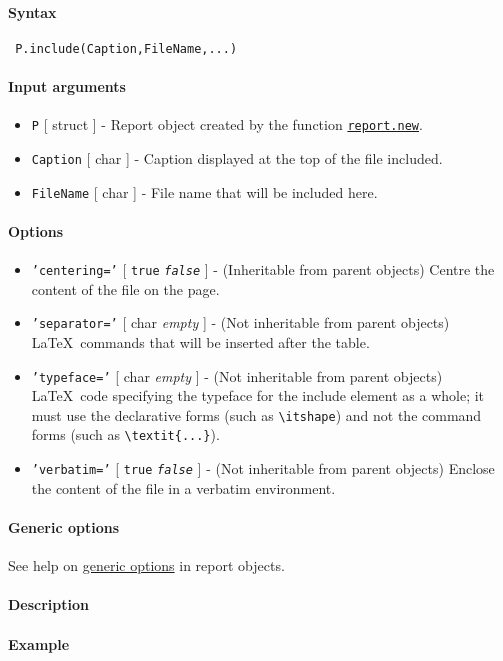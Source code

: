 


	\paragraph{Syntax}
 
 \begin{verbatim}
 P.include(Caption,FileName,...)
 \end{verbatim}
 
 \paragraph{Input arguments}
 
 \begin{itemize}
 \item
   \texttt{P} {[} struct {]} - Report object created by the function
   \href{report/new}{\texttt{report.new}}.
 \item
   \texttt{Caption} {[} char {]} - Caption displayed at the top of the
   file included.
 \item
   \texttt{FileName} {[} char {]} - File name that will be included here.
 \end{itemize}
 
 \paragraph{Options}
 
 \begin{itemize}
 \item
   \texttt{'centering='} {[} \texttt{true} \textbar{}
   \emph{\texttt{false}} {]} - (Inheritable from parent objects) Centre
   the content of the file on the page.
 \item
   \texttt{'separator='} {[} char \textbar{} \emph{empty} {]} - (Not
   inheritable from parent objects) \LaTeX~commands that will be inserted
   after the table.
 \item
   \texttt{'typeface='} {[} char \textbar{} \emph{empty} {]} - (Not
   inheritable from parent objects) \LaTeX~code specifying the typeface
   for the include element as a whole; it must use the declarative forms
   (such as \texttt{\textbackslash{}itshape}) and not the command forms
   (such as \texttt{\textbackslash{}textit\{...\}}).
 \item
   \texttt{'verbatim='} {[} \texttt{true} \textbar{}
   \emph{\texttt{false}} {]} - (Not inheritable from parent objects)
   Enclose the content of the file in a verbatim environment.
 \end{itemize}
 
 \paragraph{Generic options}
 
 See help on \href{report/Contents}{generic options} in report objects.
 
 \paragraph{Description}
 
 \paragraph{Example}


